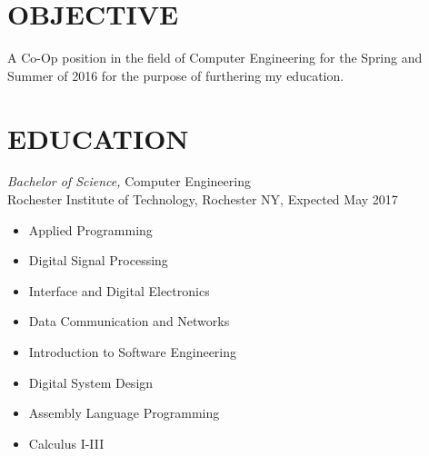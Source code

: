 \documentclass[line,margin]{res}
\begin{document}
\setlength\columnsep{-30pt}
\address{56 South Street Drury, MA}
\address{CRC3510@RIT.EDU}
\address{(413) 376-5034}

 
\begin{resume}
 \setlength\multicolsep{2pt}

\section{OBJECTIVE}   
	A Co-Op position in the field of Computer Engineering for the Spring and Summer of 2016 for the purpose of furthering my education.  
 
\section{EDUCATION} {\sl Bachelor of Science,} Computer Engineering \\
                Rochester Institute of Technology, Rochester NY, 
				Expected May 2017 %
				\begin{multicols}{2}
					\begin{itemize}
						\itemsep -2pt
						\item[] Applied Programming
						\item[] Digital Signal Processing
						\item[] Interface and Digital Electronics
						\item[] Data Communication and Networks
						\item[] Introduction to Software Engineering
						\item[] Digital System Design
						\item[] Assembly Language Programming
						\item[] Calculus I-III
					\end{itemize}
				\end{multicols}
 

\end{resume}
\end{document}
